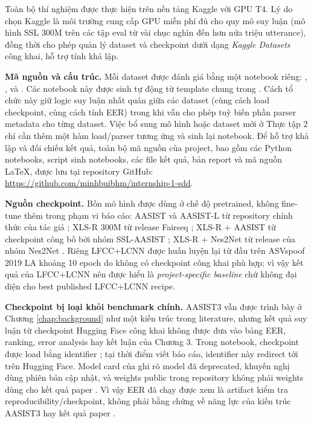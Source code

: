 Toàn bộ thí nghiệm được thực hiện trên nền tảng Kaggle với GPU T4. Lý do chọn Kaggle là môi trường cung cấp GPU miễn phí đủ cho quy mô suy luận (mô hình SSL 300M trên các tập eval từ vài chục nghìn đến hơn nửa triệu utterance), đồng thời cho phép quản lý dataset và checkpoint dưới dạng \textit{Kaggle Datasets} công khai, hỗ trợ tính khả lập.

\textbf{Mã nguồn và cấu trúc.} Mỗi dataset được đánh giá bằng một notebook riêng: , ,  và . Các notebook này được sinh tự động từ template chung trong . Cách tổ chức này giữ logic suy luận nhất quán giữa các dataset (cùng cách load checkpoint, cùng cách tính EER) trong khi vẫn cho phép tuỳ biến phần parser metadata cho từng dataset. Việc bổ sung mô hình hoặc dataset mới ở Thực tập 2 chỉ cần thêm một hàm load/parser tương ứng và sinh lại notebook. Để hỗ trợ khả lập và đối chiếu kết quả, toàn bộ mã nguồn của project, bao gồm các Python notebooks, script sinh notebooks, các file kết quả, bản report và mã nguồn LaTeX, được lưu tại repository GitHub: \url{https://github.com/minhbuibhm/internship-1-sdd}.

\textbf{Nguồn checkpoint.} Bốn mô hình được dùng ở chế độ pretrained, không fine-tune thêm trong phạm vi báo cáo: AASIST và AASIST-L từ repository chính thức của tác giả \cite{aasist_github}; XLS-R 300M từ release Fairseq \cite{xlsr_fairseq_checkpoint}; XLS-R + AASIST từ checkpoint công bố bởi nhóm SSL-AASIST \cite{ssl_aasist}; XLS-R + Nes2Net từ release của nhóm Nes2Net \cite{nes2net}. Riêng LFCC+LCNN được huấn luyện lại từ đầu trên ASVspoof 2019 LA khoảng 10 epoch do không có checkpoint công khai phù hợp; vì vậy kết quả của LFCC+LCNN nên được hiểu là \textit{project-specific baseline} chứ không đại diện cho best published LFCC+LCNN recipe.

\textbf{Checkpoint bị loại khỏi benchmark chính.} AASIST3 vẫn được trình bày ở Chương \ref{chap:background} như một kiến trúc trong literature, nhưng kết quả suy luận từ checkpoint Hugging Face công khai không được đưa vào bảng EER, ranking, error analysis hay kết luận của Chương 3. Trong notebook, checkpoint được load bằng identifier ; tại thời điểm viết báo cáo, identifier này redirect tới  trên Hugging Face. Model card của  ghi rõ model đã deprecated, khuyến nghị dùng phiên bản cập nhật, và weights public trong repository không phải weights dùng cho kết quả paper \cite{aasist3_hf}. Vì vậy EER đã chạy được xem là artifact kiểm tra reproducibility/checkpoint, không phải bằng chứng về năng lực của kiến trúc AASIST3 hay kết quả paper \cite{aasist3}.

